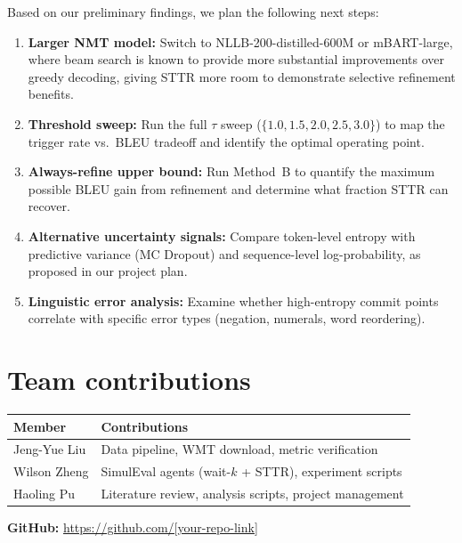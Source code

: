 Based on our preliminary findings, we plan the following next steps:

\begin{enumerate}[leftmargin=*]
    \item \textbf{Larger NMT model:} Switch to NLLB-200-distilled-600M or mBART-large, where beam search is known to provide more substantial improvements over greedy decoding, giving STTR more room to demonstrate selective refinement benefits.
    \item \textbf{Threshold sweep:} Run the full $\tau$ sweep ($\{1.0, 1.5, 2.0, 2.5, 3.0\}$) to map the trigger rate vs.\ BLEU tradeoff and identify the optimal operating point.
    \item \textbf{Always-refine upper bound:} Run Method~B to quantify the maximum possible BLEU gain from refinement and determine what fraction STTR can recover.
    \item \textbf{Alternative uncertainty signals:} Compare token-level entropy with predictive variance (MC Dropout) and sequence-level log-probability, as proposed in our project plan.
    \item \textbf{Linguistic error analysis:} Examine whether high-entropy commit points correlate with specific error types (negation, numerals, word reordering).
\end{enumerate}

\section{Team contributions}

\begin{table}[h]
\centering
\begin{tabular}{ll}
    \toprule
    Member & Contributions \\
    \midrule
    Jeng-Yue Liu & Data pipeline, WMT download, metric verification \\
    Wilson Zheng & SimulEval agents (wait-$k$ + STTR), experiment scripts \\
    Haoling Pu & Literature review, analysis scripts, project management \\
    \bottomrule
\end{tabular}
\end{table}

\noindent\textbf{GitHub:} \url{https://github.com/[your-repo-link]}
